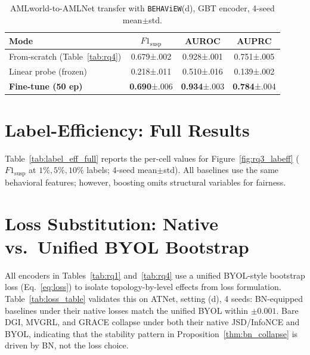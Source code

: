 \documentclass[sigconf,natbib=true,anonymous=true]{acmart}
\theoremstyle{definition}
\newcommand{\method}{\texttt{BEHAViEW}\xspace}
\newcommand{\hofinet}{ATNet\xspace} %
\begin{document}
\begin{table}[h]
\centering
\caption{AMLworld-to-AMLNet transfer with \method (d), GBT encoder, 4-seed mean$\pm$std.}
\label{tab:transfer}
\small
\begin{tabular}{lccc}
\toprule
\textbf{Mode} & \textbf{$F1_{\text{susp}}$} & \textbf{AUROC} & \textbf{AUPRC} \\
\midrule
From-scratch (Table~\ref{tab:rq4}) & 0.679{\scriptsize±.002} & 0.928{\scriptsize±.001} & 0.751{\scriptsize±.005} \\
Linear probe (frozen)              & 0.218{\scriptsize±.011} & 0.510{\scriptsize±.016} & 0.139{\scriptsize±.002} \\
\textbf{Fine-tune (50 ep)}         & \textbf{0.690}{\scriptsize±.006} & \textbf{0.934}{\scriptsize±.003} & \textbf{0.784}{\scriptsize±.004} \\
\bottomrule
\end{tabular}
\end{table}

\section{Label-Efficiency: Full Results}
\label{app:label_eff_full}
Table~\ref{tab:label_eff_full} reports the per-cell values for Figure~\ref{fig:rq3_labeff} ($F1_{\text{susp}}$ at $1\%,5\%,10\%$ labels; 4-seed mean$\pm$std). All baselines use the same behavioral features; however, boosting omits structural variables for fairness.

\section{Loss Substitution: Native vs.\ Unified BYOL Bootstrap}
\label{app:loss_table}

All encoders in Tables~\ref{tab:rq1} and~\ref{tab:rq4} use a unified BYOL-style bootstrap loss (Eq.~\eqref{eq:loss}) to isolate topology-by-level effects from loss formulation. Table~\ref{tab:loss_table} validates this on \hofinet, setting (d), 4 seeds: BN-equipped baselines under their native losses match the unified BYOL within $\pm 0.001$. Bare DGI, MVGRL, and GRACE collapse under both their native JSD/InfoNCE and BYOL, indicating that the stability pattern in Proposition~\ref{thm:bn_collapse} is driven by BN, not the loss choice.
\end{document}
